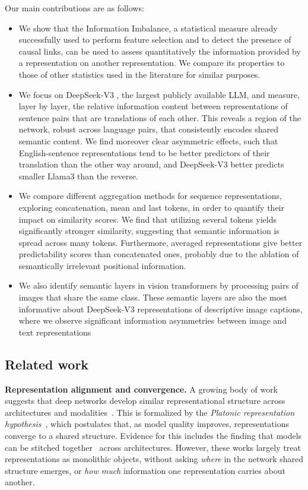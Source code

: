 \documentclass[10pt]{article} %
\begin{document}
Our main contributions are as follows:
\begin{itemize}
\item We show that the Information Imbalance,  a statistical measure already successfully used to perform feature selection\cite{} and to detect the presence of causal links\cite{}, can be used to assess quantitatively the information provided by a representation on another representation. We compare its properties to those of other statistics used in the literature for similar purposes. 
\item We focus on DeepSeek-V3 , the largest publicly available LLM, and measure, layer by layer, the relative information content between representations of sentence pairs that are translations of each other. This reveals a region of the network, robust across language pairs, that consistently encodes shared semantic content. We find moreover clear asymmetric effects, such that English-sentence representations tend to be better predictors of their translation than the other way around, and DeepSeek-V3 better predicts smaller Llama3 than the reverse.
\item We compare different aggregation methods for sequence representations, exploring concatenation, mean and last tokens, in order to quantify their impact on similarity scores. We find that utilizing several tokens yields significantly stronger similarity, suggesting that semantic information is spread across many tokens. Furthermore, averaged representations give better predictability scores than concatenated ones, probably due to the ablation of semantically irrelevant positional information.
\item We also identify semantic layers in vision transformers by processing pairs of images that share the same class. These semantic layers are also the most informative about DeepSeek-V3 representations of descriptive image captions, where we observe significant information asymmetries between image and text representations

\end{itemize}

\subsection{Related work}
\textbf{Representation alignment and convergence.} A growing body of work suggests that deep networks develop similar representational structure across architectures and modalities~\citep{Kornblith:etal:2019, Sorscher:etal:2022, Maniparambil:etal:2024, rep_alignment}. This is formalized by the \textit{Platonic representation hypothesis}~\citep{platonic_hypothesis}, which postulates that, as model quality improves, representations converge to a shared structure. Evidence for this includes the finding that models can be stitched together~\citep{stitchin0,Stitching_bansal,moschella2023} across architectures. However, these works largely treat representations as monolithic objects, without asking \emph{where} in the network shared structure emerges, or \emph{how much} information one representation carries about another.
\end{document}

